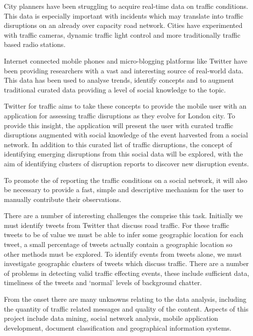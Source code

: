 City planners have been struggling to acquire real-time data on traffic
conditions. This data is especially important with incidents which may
translate into traffic disruptions on an already over capacity road network.
Cities have experimented with traffic cameras, dynamic traffic light control
and more traditionally traffic based radio stations.

Internet connected mobile phones and micro-blogging platforms like Twitter have
been providing researchers with a vast and interesting source of real-world
data. This data has been used to analyse trends, identify concepts and to
augment traditional curated data providing a level of social knowledge to the
topic.

Twitter for traffic aims to take these concepts to provide the mobile user with
an application for assessing traffic disruptions as they evolve for London
city. To provide this insight, the application will present the user with
curated traffic disruptions augmented with social knowledge of the event
harvested from a social network.  In addition to this curated list of traffic
disruptions, the concept of identifying emerging disruptions from this social
data will be explored, with the aim of identifying clusters of disruption
reports to discover new disruption events.

To promote the of reporting the traffic conditions on a social network, it will
also be necessary to provide a fast, simple and descriptive mechanism for the
user to manually contribute their observations.

There are a number of interesting challenges the comprise this task. Initially
we must identify tweets from Twitter that discuss road traffic. For these
traffic tweets to be of value we must be able to infer some geographic location
for each tweet, a small percentage of tweets actually contain a geographic
    location so other methods must be explored. To identify events from tweets
    alone, we must investigate geographic clusters of tweets which discuss
    traffic. There are a number of problems in detecting valid traffic
    effecting events, these include sufficient data, timeliness of the tweets
    and  ‘normal’ levels of background chatter.

    From the onset there are many unknowns relating to the data analysis,
    including the quantity of traffic related messages and quality of the
    content. Aspects of this project include data mining, social network
    analysis, mobile application development, document classification and
    geographical information systems.
